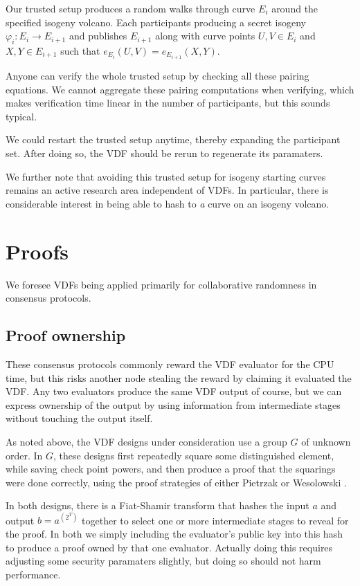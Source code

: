 \documentclass{article}
\begin{document}
Our trusted setup produces a random walks through curve $E_i$ around
the specified isogeny volcano.  Each participants producing a secret
isogeny $φ_i : E_i \to E_{i+1}$ and publishes $E_{i+1}$ along with
curve points $U,V \in E_i$ and $X,Y \in E_{i+1}$ such that
$e_{E_i}(U,V) = e_{E_{i+1}}(X,Y)$.  

Anyone can verify the whole trusted setup by checking all these
pairing equations.  We cannot aggregate these pairing computations
when verifying, which makes verification time linear in the number
of participants, but this sounds typical.

We could restart the trusted setup anytime, thereby expanding the
participant set.  After doing so, the VDF should be rerun to
regenerate its paramaters.

We further note that avoiding this trusted setup for isogeny starting
curves remains an active research area independent of VDFs. 
In particular, there is considerable interest in being able to hash to
{\it a} curve on an isogeny volcano.


\section{Proofs}

We foresee VDFs being applied primarily for collaborative randomness
in consensus protocols.  

\subsection{Proof ownership}

These consensus protocols commonly reward the VDF evaluator for the
CPU time, but this risks another node stealing the reward by claiming
it evaluated the VDF.  Any two evaluators produce the same VDF output
of course, but we can express ownership of the output by using
information from intermediate stages without touching the output itself.

As noted above, the VDF designs under consideration use a group $G$
of unknown order.  In $G$, these designs first repeatedly square
some distinguished element, while saving check point powers, and
then produce a proof that the squarings were done correctly, using
the proof strategies of
 either Pietrzak \cite{Pietrzak} or Wesolowski \cite{Wesolowski}.

In both designs, there is a Fiat-Shamir transform that hashes the
input $a$ and output $b = a^(2^T)$ together to select one or more
intermediate stages to reveal for the proof.  In both we simply
including the evaluator's public key into this hash to produce a
proof owned by that one evaluator.  Actually doing this requires
adjusting some security paramaters slightly, but doing so should not
harm performance. 
\end{document}
